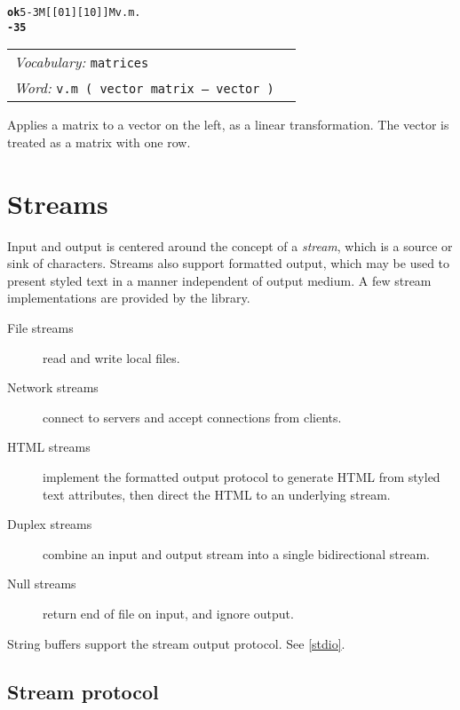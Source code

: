\documentclass{book}
\newcommand{\tto}{\symbol{123}}
\newcommand{\ttc}{\symbol{125}}
\newcommand{\vocabulary}[1]{\emph{Vocabulary:} \texttt{#1}&\\}
\newcommand{\ordinaryword}[2]{\index{\texttt{#1}}\emph{Word:} \texttt{#2}&\\}
\newcommand{\wordtable}[1]{


\begin{tabularx}{12cm}{lX}
\hline
#1
\hline
\end{tabularx}

}
\begin{document}
\begin{alltt}
\textbf{ok} \tto 5 -3 \ttc M[ [ 0 1 ] [ 1 0 ] ]M v.m .
\textbf{\tto -3 5 \ttc}
\end{alltt}

\wordtable{
\vocabulary{matrices}
\ordinaryword{v.m}{v.m~( vector matrix -- vector )}
}
Applies a matrix to a vector on the left, as a linear transformation. The vector is
treated as a matrix with one row.

\section{Streams}

Input and output is centered around the concept of a \emph{stream}, which is a source or
sink of characters. Streams also support formatted output, which may be used to present styled text in a manner independent of output medium. A few stream implementations are provided by the library.

\begin{description}
\item[File streams] read and write local files.
\item[Network streams] connect to servers and accept connections from clients.
\item[HTML streams] implement the formatted output protocol to generate HTML from styled text attributes, then direct the HTML to an underlying stream.
\item[Duplex streams] combine an input and output stream into a single bidirectional stream.
\item[Null streams] return end of file on input, and ignore output.
\end{description}

String buffers support the stream output protocol. See \ref{stdio}.

\subsection{Stream protocol}\label{stream-protocol}
\end{document}
